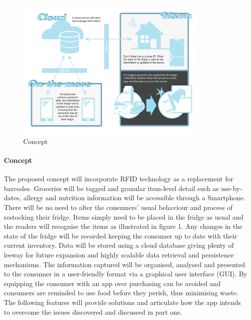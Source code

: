 \documentclass[a4paper, 11pt]{article}
\begin{document}
\begin{figure}[h!]
  \centering
    \includegraphics[width=0.85\textwidth]{system2.png}
      \caption{Concept}
\end{figure}

\paragraph{Concept}The proposed concept will incorporate RFID technology as a replacement for barcodes. Groceries will be tagged and granular item-level detail such as use-by-dates, allergy and nutrition information will be accessible through a Smartphone. There will be no need to alter the consumers' usual behaviour and process of restocking their fridge. Items simply need to be placed in the fridge as usual and the readers will recognise the items as illustrated in figure 1. Any changes in the state of the fridge will be recorded keeping the consumer up to date with their current inventory. Data will be stored using a cloud database giving plenty of leeway for future expansion and highly scalable data retrieval and persistence mechanisms. The information captured will be organised, analysed and presented to the consumer in a user-friendly format via a graphical user interface (GUI). By equipping the consumer with an app over purchasing can be avoided and consumers are reminded to use food before they perish, thus minimising waste. The following features will provide solutions and articulate how the app intends to overcome the issues discovered and discussed in part one.

\vspace{\baselineskip}
\end{document}
